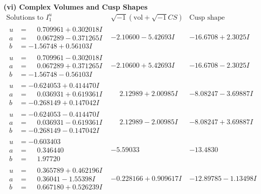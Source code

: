 \documentclass[1p]{elsarticle_modified}
\theoremstyle{definition}
\newcommand{\I}{\sqrt{-1}}
\begin{document}
\newpage\flushleft \textbf{(vi) Complex Volumes and Cusp Shapes}
$$\begin{array}{c|c|c}  
\text{Solutions to }I^u_{1}& \I (\text{vol} + \sqrt{-1}CS) & \text{Cusp shape}\\
 \hline 
\begin{aligned}
u &= \phantom{-}0.709961 + 0.302018 I \\
a &= \phantom{-}0.067289 - 0.371265 I \\
b &= -1.56748 + 0.56103 I\end{aligned}
 & -2.10600 - 5.42693 I & -16.6708 + 2.3025 I \\ \hline\begin{aligned}
u &= \phantom{-}0.709961 - 0.302018 I \\
a &= \phantom{-}0.067289 + 0.371265 I \\
b &= -1.56748 - 0.56103 I\end{aligned}
 & -2.10600 + 5.42693 I & -16.6708 - 2.3025 I \\ \hline\begin{aligned}
u &= -0.624053 + 0.414470 I \\
a &= \phantom{-}0.036931 + 0.619361 I \\
b &= -0.268149 + 0.147042 I\end{aligned}
 & \phantom{-}2.12989 + 2.00985 I & -8.08247 - 3.69887 I \\ \hline\begin{aligned}
u &= -0.624053 - 0.414470 I \\
a &= \phantom{-}0.036931 - 0.619361 I \\
b &= -0.268149 - 0.147042 I\end{aligned}
 & \phantom{-}2.12989 - 2.00985 I & -8.08247 + 3.69887 I \\ \hline\begin{aligned}
u &= -0.603403\phantom{ +0.000000I} \\
a &= \phantom{-}0.346440\phantom{ +0.000000I} \\
b &= \phantom{-}1.97720\phantom{ +0.000000I}\end{aligned}
 & -5.59033\phantom{ +0.000000I} & -13.4830\phantom{ +0.000000I} \\ \hline\begin{aligned}
u &= \phantom{-}0.365789 + 0.462196 I \\
a &= \phantom{-}0.36041 - 1.55398 I \\
b &= \phantom{-}0.667180 + 0.526239 I\end{aligned}
 & -0.228166 + 0.909617 I & -12.89785 - 1.13498 I \\ \hline\begin{aligned}

\end{aligned}
\end{array}$$
\end{document}
